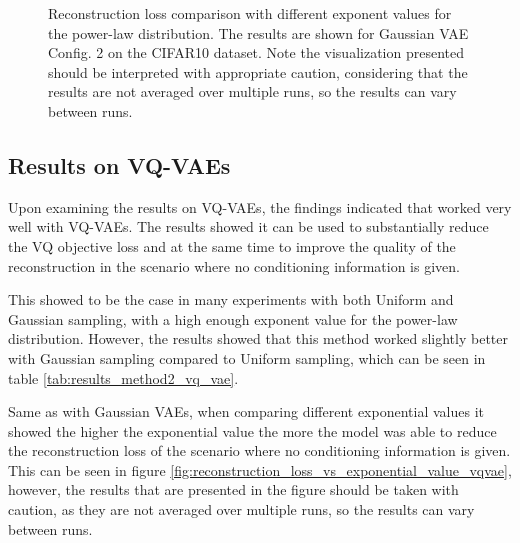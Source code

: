 \begin{figure}[H]
    \centering
    \scalebox{0.48}{}
    \caption[Reconstruction loss comparison with different exponent values.]
    {
        Reconstruction loss comparison with different exponent values for the power-law distribution. The results are shown for Gaussian VAE Config. 2 on the CIFAR10 dataset. Note the visualization presented should be interpreted with appropriate caution, considering that the results are not averaged over multiple runs, so the results can vary between runs.
    }
    \label{fig:reconstruction_loss_vs_exponential_value_gaussian}
\end{figure}

\subsection{Results on VQ-VAEs}

Upon examining the results on VQ-VAEs, the findings indicated that  worked very well with VQ-VAEs. The results showed it can be used to substantially reduce the VQ objective loss and at the same time to improve the quality of the reconstruction in the scenario where no conditioning information is given. 

This showed to be the case in many experiments with both Uniform and Gaussian sampling, with a high enough exponent value for the power-law distribution. However, the results showed that this method worked slightly better with Gaussian sampling compared to Uniform sampling, which can be seen in table \ref{tab:results_method2_vq_vae}.

Same as with Gaussian VAEs, when comparing different exponential values it showed the higher the exponential value the more the model was able to reduce the reconstruction loss of the scenario where no conditioning information is given. This can be seen in figure \ref{fig:reconstruction_loss_vs_exponential_value_vqvae}, however, the results that are presented in the figure should be taken with caution, as they are not averaged over multiple runs, so the results can vary between runs.




